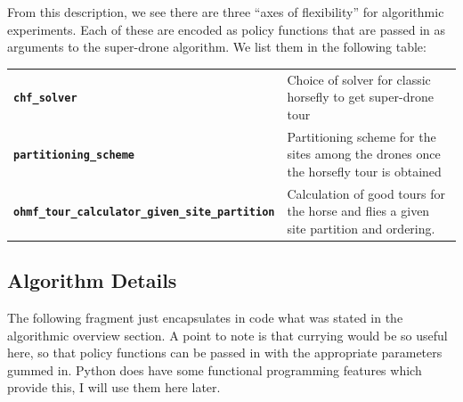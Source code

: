 \documentclass[11.5pt]{report}
\begin{document}
From this description, we see there are three ``axes of flexibility'' for algorithmic 
experiments. Each of these are encoded as policy functions that are passed in as arguments 
to the super-drone algorithm. We list them in the following table:
\begin{description}
\item[] 
\item[] 
\item[] 
\end{description}

\begin{center}
\begin{tabular}{ l l }
  \textbf{\texttt{chf\_solver}} & Choice of solver for classic horsefly to get super-drone tour   \\
   \textbf{\texttt{partitioning\_scheme}} &  Partitioning scheme for the sites 
                                             among the drones once the horsefly 
                                             tour is obtained \\
  \textbf{\texttt{ohmf\_tour\_calculator\_given\_site\_partition}} & Calculation of good tours for the
                                             horse and flies a given site partition and ordering.   
\end{tabular}
\end{center}





\subsection{Algorithm Details}

\newchunk The following fragment just encapsulates in code what was stated in the algorithmic
overview section. A point to note is that currying would be so useful here, so that policy functions can be passed in with the appropriate
parameters gummed in. Python does have some functional programming features which provide
this, I will use them here later. 
\end{document}
